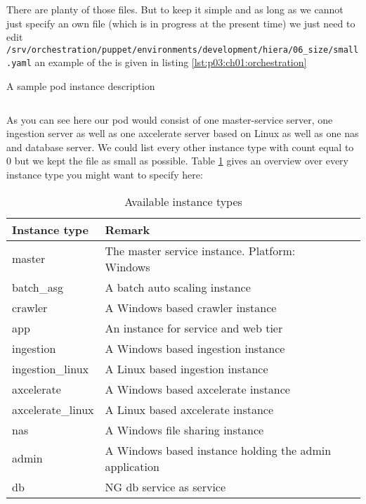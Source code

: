 	There are planty of those files. But to keep it simple and as long as we cannot just specify an own file (which is in progress at the present time) we just need to edit \texttt{/srv/orchestration/puppet/environments/development/hiera/06_size/small.yaml} an example of the is given in listing \ref{lst:p03:ch01:orchestration}
	\begin{listing}[H]
		\caption{A sample pod instance description}
		\label{lst:p03:ch01:orchestration}
		\inputminted{yaml}{\relative{chapter_00/section_1.4/pod_instance_description.yaml}}
	\end{listing}
	As you can see here our pod would consist of one master-service server, one ingestion server as well as one axcelerate server based on Linux as well as one nas and database server. We could list every other instance type with count equal to $0$ but we kept the file as small as possible. Table \ref{tab:p03:ch01:instance_types} gives an overview over every instance type you might want to specify here:
	\begin{table}[h]
         \center
         \caption{Available instance types}
         \begin{tabular}{| l | l | l |}
           \hline
           \textbf{Instance type} & \textbf{Remark} \\ \hline
           master & The master service instance. Platform: Windows \\ \hline
           batch\_asg & A batch auto scaling instance \\ \hline
           crawler & A Windows based crawler instance \\ \hline
           app & An instance for service and web tier \\ \hline
           ingestion & A Windows based ingestion instance \\ \hline
           ingestion\_linux & A Linux based ingestion instance \\ \hline
           axcelerate & A Windows based axcelerate instance \\ \hline
           axcelerate\_linux & A Linux based axcelerate instance \\ \hline
           nas & A Windows file sharing instance \\ \hline
           admin & A Windows based instance holding the admin application \\ \hline
           db & NG db service as \aws{} service \\ \hline
         \end{tabular}
         \label{tab:p03:ch01:instance_types}
      \end{table}
	
